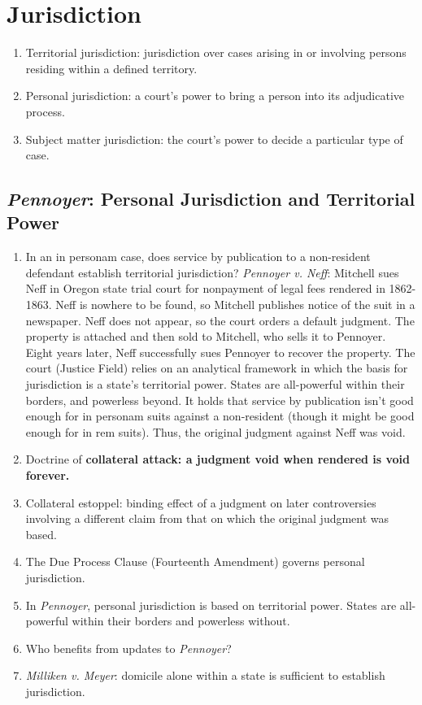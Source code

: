 \section{Jurisdiction}

\begin{enumerate}
    \item Territorial jurisdiction: jurisdiction over cases arising in or 
    involving persons residing within a defined territory.
    \item Personal jurisdiction: a court's power to bring a person into its 
    adjudicative process.
    \item Subject matter jurisdiction: the court's power to decide a 
    particular type of case.
\end{enumerate}

\subsection{\emph{Pennoyer}: Personal Jurisdiction and Territorial Power}

\begin{enumerate}
    \item  In an in personam case, does service by publication to a 
    non-resident defendant establish territorial jurisdiction? \emph{Pennoyer 
    v. Neff}:
Mitchell sues Neff in Oregon state trial court for nonpayment of legal fees 
rendered in 1862-1863. Neff is nowhere to be found, so Mitchell publishes 
notice of the suit in a newspaper. Neff does not appear, so the court orders a 
default judgment. The property is attached and then sold to Mitchell, who 
sells it to Pennoyer. Eight years later, Neff successfully sues Pennoyer to 
recover the property. The court (Justice Field) relies on an analytical 
framework in which the basis for jurisdiction is a state's territorial power. 
States are all-powerful within their borders, and powerless beyond. It holds 
that service by publication isn't good enough for in personam suits against a 
non-resident (though it might be good enough for in rem suits). Thus, the 
original judgment against Neff was void.
    \item Doctrine of \textbf{collateral attack: a judgment void when rendered 
    is void forever.}
    \item Collateral estoppel: binding effect of a judgment on later 
    controversies involving a different claim from that on which the original 
    judgment was based.
    \item The Due Process Clause (Fourteenth Amendment) governs personal 
    jurisdiction.
    \item In \emph{Pennoyer}, personal jurisdiction is based on territorial 
    power. States are all-powerful within their borders and powerless without.
    \item Who benefits from updates to \emph{Pennoyer}?
    \item \emph{Milliken v. Meyer}: domicile alone within a state is 
    sufficient to establish jurisdiction.
\end{enumerate}

